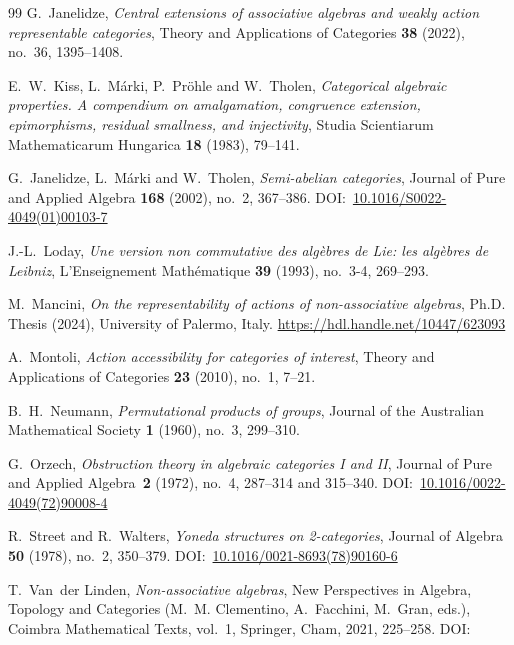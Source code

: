 \documentclass[reqno,hidelinks,a4paper]{amsart}
\renewcommand{\doi}[1]{DOI:~\href{https://doi.org/#1}{#1}}
\theoremstyle{plain}
\theoremstyle{definition}
\theoremstyle{remark}
\numberwithin{equation}{section}
\begin{document}
\begin{thebibliography}{99}
    G.~Janelidze, \emph{Central extensions of associative algebras and weakly action representable categories}, Theory and Applications of Categories \textbf{38} (2022), no.~36, 1395--1408.

    E.~W.~Kiss, L.~Márki, P.~Pröhle and W.~Tholen, \emph{Categorical algebraic properties. A compendium on amalgamation, congruence extension, epimorphisms, residual smallness, and injectivity}, Studia Scientiarum Mathematicarum Hungarica \textbf{18} (1983), 79--141.

    G.~Janelidze, L.~Márki and W.~Tholen, \emph{Semi-abelian categories}, Journal of Pure and Applied Algebra \textbf{168} (2002), no.~2, 367--386. \doi{10.1016/S0022-4049(01)00103-7}

    J.-L.~Loday, \emph{Une version non commutative des algèbres de Lie: les algèbres de Leibniz}, L'Enseignement Math\'ematique \textbf{39} (1993), no.~3-4, 269--293.

    M.~Mancini, \emph{On the representability of actions of non-associative algebras}, Ph.D. Thesis (2024), University of Palermo, Italy. \url{https://hdl.handle.net/10447/623093}

    A.~Montoli, \emph{Action accessibility for categories of interest}, Theory and Applications of Categories \textbf{23} (2010), no.~1, 7--21.

    B.~H.~Neumann, \emph{Permutational products of groups}, Journal of the Australian Mathematical Society \textbf{1} (1960), no.~3, 299--310.

    G.~Orzech, \emph{Obstruction theory in algebraic categories {I} and {II}}, Journal of Pure and Applied Algebra~\textbf{2} (1972), no.~4, 287--314 and 315--340. \doi{10.1016/0022-4049(72)90008-4}

    R.~Street and R.~Walters, \emph{Yoneda structures on 2-categories}, Journal of Algebra \textbf{50} (1978), no.~2, 350--379. \doi{10.1016/0021-8693(78)90160-6}

    T.~Van~der Linden, \emph{Non-associative algebras}, New Perspectives in Algebra, Topology and Categories (M.~M. Clementino, A.~Facchini, M.~Gran, eds.), Coimbra Mathematical Texts, vol.~1, Springer, Cham, 2021, 225--258. \doi{}
\end{thebibliography}
\end{document}
